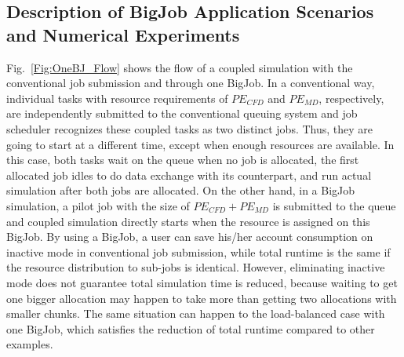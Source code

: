 \documentclass[conference,final]{IEEEtran}
\begin{document}

\subsection{Description of BigJob Application Scenarios and Numerical Experiments}


Fig.~\ref{Fig:OneBJ_Flow} shows the flow of a coupled simulation with
the conventional job submission and through one BigJob. In a
conventional way, individual tasks with resource requirements of
$PE_{CFD}$ and $PE_{MD}$, respectively, are independently submitted to
the conventional queuing system and job scheduler recognizes these
coupled tasks as two distinct jobs. Thus, they are going to start at a
different time, except when enough resources are available. In this
case, both tasks wait on the queue when no job is allocated, the first
allocated job idles to do data exchange with its counterpart, and run
actual simulation after both jobs are allocated. On the other hand, in
a BigJob simulation, a pilot job with the size of $PE_{CFD}+PE_{MD}$
is submitted to the queue and coupled simulation directly starts when
the resource is assigned on this BigJob. By using a BigJob, a user can
save his/her account consumption on inactive mode in conventional job
submission, while total runtime is the same if the resource
distribution to sub-jobs is identical. However, eliminating inactive
mode does not guarantee total simulation time is reduced, because
waiting to get one bigger allocation may happen to take more than
getting two allocations with smaller chunks. The same situation can
happen to the load-balanced case with one BigJob, which satisfies the
reduction of total runtime compared to other examples.
\end{document}
